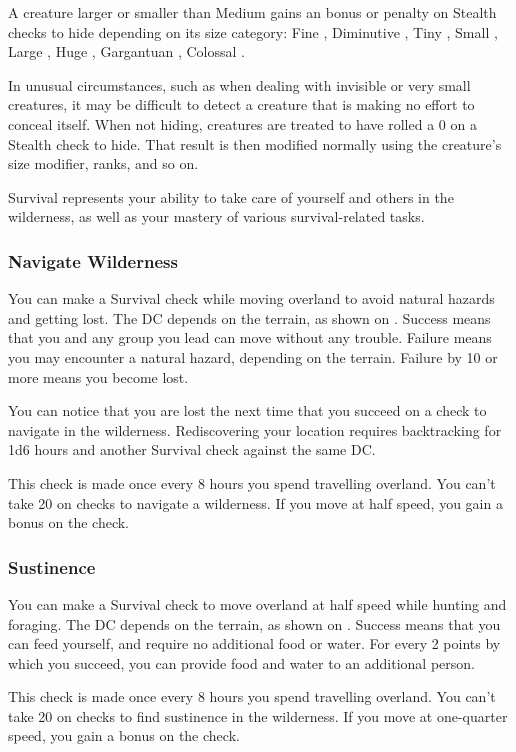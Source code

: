A creature larger or smaller than Medium gains an bonus or penalty on Stealth checks to hide depending on its size category: Fine , Diminutive , Tiny , Small , Large , Huge , Gargantuan , Colossal .

 In unusual circumstances, such as when dealing with invisible or very small creatures, it may be difficult to detect a creature that is making no effort to conceal itself. When not hiding, creatures are treated to have rolled a 0 on a Stealth check to hide. That result is then modified normally using the creature's size modifier, ranks, and so on.

Survival represents your ability to take care of yourself and others in the wilderness, as well as your mastery of various survival-related tasks. 

\subsubsection{Navigate Wilderness}
You can make a Survival check while moving overland to avoid natural hazards and getting lost. The DC depends on the terrain, as shown on . Success means that you and any group you lead can move without any trouble. Failure means you may encounter a natural hazard, depending on the terrain. Failure by 10 or more means you become lost.

You can notice that you are lost the next time that you succeed on a check to navigate in the wilderness. Rediscovering your location requires backtracking for 1d6 hours and another Survival check against the same DC.

This check is made once every 8 hours you spend travelling overland. You can't take 20 on checks to navigate a wilderness. If you move at half speed, you gain a  bonus on the check.

\subsubsection{Sustinence}
You can make a Survival check to move overland at half speed while hunting and foraging. The DC depends on the terrain, as shown on . Success means that you can feed yourself, and require no additional food or water. For every 2 points by which you succeed, you can provide food and water to an additional person.

This check is made once every 8 hours you spend travelling overland. You can't take 20 on checks to find sustinence in the wilderness. If you move at one-quarter speed, you gain a  bonus on the check.

